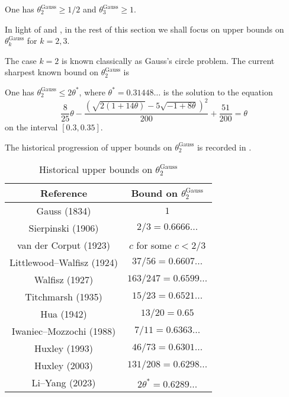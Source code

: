 \begin{theorem}\label{gauss-circle-lower-23}
One has $\theta^{\operatorname{Gauss}}_{2} \ge 1/2$ and $\theta^{\operatorname{Gauss}}_{3} \ge 1$.
\end{theorem}

In light of  and , in the rest of this section we shall focus on upper bounds on $\theta^{\operatorname{Gauss}}_{k}$ for $k = 2, 3$.

The case $k = 2$ is known classically as Gauss's circle problem. The current sharpest known bound on $\theta_2^{\operatorname{Gauss}}$ is
\begin{theorem} 
One has $\theta_2^{\operatorname{Gauss}} \le 2\theta^*$, where $\theta^* = 0.31448\ldots$ is the solution to the equation
\[
\frac{8}{25}\theta - \frac{(\sqrt{2(1+14\theta)} - 5\sqrt{-1+8\theta})^2}{200} + \frac{51}{200} = \theta
\]
on the interval $[0.3, 0.35]$.
\end{theorem}

The historical progression of upper bounds on $\theta_2^{\operatorname{Gauss}}$ is recorded in .


\begin{table}[ht]
    \def\arraystretch{1.2}
    \centering
    \caption{Historical upper bounds on $\theta_2^{\operatorname{Gauss}}$}
    \begin{tabular}{|c|c|}
    \hline
    Reference & Bound on $\theta_2^{\operatorname{Gauss}}$\\
    \hline
    Gauss (1834) & $1$\\
    \hline
    Sierpinski (1906) \cite{sierpinski_pewnem_1906} & $2/3 = 0.6666\ldots$\\
    \hline
    van der Corput (1923) \cite{van_der_corput_neue_1923} & $c$ for some $c < 2/3$\\
    \hline
    Littlewood--Walfisz (1924) \cite{littlewood_lattice_1924} & $37/56 = 0.6607\ldots$\\
    \hline
    Walfisz (1927) \cite{} & $163/247 = 0.6599\ldots$\\
    \hline
    Titchmarsh (1935) \cite{} & $15/23 = 0.6521\ldots$\\
    \hline
    Hua (1942) \cite{} & $13/20 = 0.65$\\
    \hline
    Iwaniec--Mozzochi (1988) \cite{iwaniec_divisor_1988} & $7/11 = 0.6363\ldots$ \\
    \hline
    Huxley (1993) \cite{} & $46/73 = 0.6301\ldots$\\
    \hline
    Huxley (2003) \cite{huxley_exponential_2003} & $131/208 = 0.6298\ldots$\\
    \hline
    Li--Yang (2023) \cite{li_yang_gauss_2024} & $2\theta^* = 0.6289\ldots$\\
    \hline 
    \end{tabular}
\label{gauss-circle-table-2}
\end{table}

